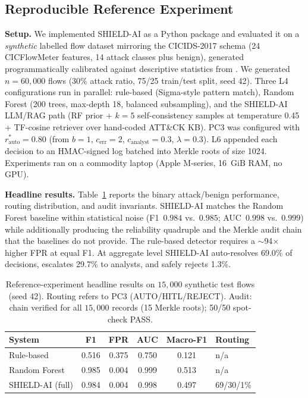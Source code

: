 \documentclass[journal]{IEEEtran}
\begin{document}
\subsection{Reproducible Reference Experiment}
\label{ssec:empirical}

\textbf{Setup.} We implemented SHIELD-AI as a Python package and evaluated it on a
\emph{synthetic} labelled flow dataset mirroring the CICIDS-2017 schema (24 CICFlowMeter
features, 14 attack classes plus benign), generated programmatically calibrated against
descriptive statistics from \cite{sharafaldin2018cicids}. We generated $n{=}60{,}000$ flows
(30\% attack ratio, 75/25 train/test split, seed 42). Three L4 configurations run in parallel:
rule-based (Sigma-style pattern match), Random Forest (200 trees, max-depth 18, balanced
subsampling), and the SHIELD-AI LLM/RAG path (RF prior + $k{=}5$ self-consistency samples
at temperature 0.45 + TF-cosine retriever over hand-coded ATT\&CK KB). PC3 was configured
with $r^*_{\text{auto}} = 0.80$ (from $b{=}1$, $c_{\text{err}}{=}2$, $c_{\text{analyst}}{=}0.3$,
$\lambda{=}0.3$). L6 appended each decision to an HMAC-signed log batched into Merkle roots
of size 1024. Experiments ran on a commodity laptop (Apple M-series, 16~GiB RAM, no GPU).

\textbf{Headline results.} Table~\ref{tab:exp-headline} reports the binary attack/benign
performance, routing distribution, and audit invariants. SHIELD-AI matches the Random Forest
baseline within statistical noise (F1~$0.984$ vs.~$0.985$; AUC~$0.998$ vs.~$0.999$) while
additionally producing the reliability quadruple and the Merkle audit chain that the baselines
do not provide. The rule-based detector requires a $\sim$94$\times$ higher FPR at equal F1.
At aggregate level SHIELD-AI auto-resolves 69.0\% of decisions, escalates 29.7\% to analysts,
and safely rejects 1.3\%.

\begin{table}[!t]
\renewcommand{\arraystretch}{1.2}
\caption{Reference-experiment headline results on $15{,}000$ synthetic test flows (seed 42).
Routing refers to PC3 (AUTO/HITL/REJECT). Audit: chain verified for all $15{,}000$ records
(15 Merkle roots); 50/50 spot-check PASS.}
\label{tab:exp-headline}
\centering
\scriptsize
\begin{tabular}{lccccl}
\toprule
\textbf{System} & \textbf{F1} & \textbf{FPR} & \textbf{AUC} & \textbf{Macro-F1} & \textbf{Routing} \\
\midrule
Rule-based       & 0.516 & 0.375 & 0.750 & 0.121 & n/a \\
Random Forest    & 0.985 & 0.004 & 0.999 & 0.513 & n/a \\
SHIELD-AI (full) & 0.984 & 0.004 & 0.998 & 0.497 & 69/30/1\% \\
\bottomrule
\end{tabular}
\end{table}
\end{document}
